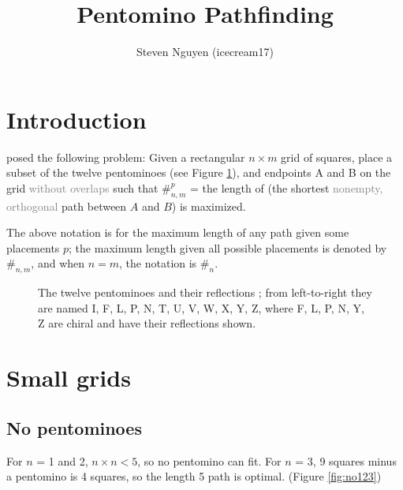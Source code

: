 \documentclass{article}
\title{Pentomino Pathfinding}
\author{Steven Nguyen (icecream17)}
\theoremstyle{definition}%
\newcommand{\minordetail}[1]{\textcolor{gray}{#1}}
\begin{document}
\maketitle


\tableofcontents





\section{Introduction}

\cite{v1} posed the following problem: Given a rectangular $n \times m$ grid of squares, place a subset of the twelve pentominoes (see Figure \ref{fig:pentominoes}), and endpoints A and B on the grid \minordetail{without overlaps} such that $\#^{p}_{n, m}$ = the length of (the shortest \minordetail{nonempty, orthogonal} path between $A$ and $B$) is maximized.

The above notation is for the maximum length of any path given some placements $p$; the maximum length given all possible placements is denoted by $\#_{n, m}$, and when $n = m$, the notation is $\#_n$.

\begin{figure}[!h]
    \centering
    
    \caption{The twelve pentominoes and their reflections \cite{pentominoes};
    from left-to-right they are named I, F, L, P, N, T, U, V, W, X, Y, Z,
    where F, L, P, N, Y, Z are chiral and have their reflections shown.}
    \label{fig:pentominoes}
\end{figure}






\section{Small grids}

\subsection{No pentominoes}

For $n$ = 1 and 2, $n \times n < 5$, so no pentomino can fit.
For $n$ = 3, 9 squares minus a pentomino is 4 squares, so the length 5 path is optimal. (Figure \ref{fig:no123})
\end{document}
